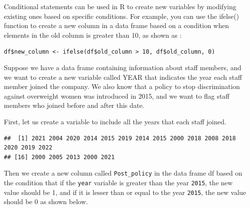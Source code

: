 \documentclass[
]{article}
\newenvironment{Shaded}{\begin{snugshade}}{\end{snugshade}}
\newcommand{\CommentTok}[1]{\textcolor[rgb]{0.56,0.35,0.01}{\textit{#1}}}
\newcommand{\DecValTok}[1]{\textcolor[rgb]{0.00,0.00,0.81}{#1}}
\newcommand{\FunctionTok}[1]{\textcolor[rgb]{0.13,0.29,0.53}{\textbf{#1}}}
\newcommand{\NormalTok}[1]{#1}
\newcommand{\OtherTok}[1]{\textcolor[rgb]{0.56,0.35,0.01}{#1}}
\newcommand{\SpecialCharTok}[1]{\textcolor[rgb]{0.81,0.36,0.00}{\textbf{#1}}}
\begin{document}
Conditional statements can be used in R to create new variables by
modifying existing ones based on specific conditions. For example, you
can use the ifelse() function to create a new column in a data frame
based on a condition when elements in the old column is greater than 10,
as shown as :

\texttt{df\$new\_column\ \textless{}-\ ifelse(df\$old\_column\ \textgreater{}\ 10,\ df\$old\_column,\ 0)}

Suppose we have a data frame containing information about staff members,
and we want to create a new variable called YEAR that indicates the year
each staff member joined the company. We also know that a policy to stop
discrimination against overweight women was introduced in 2015, and we
want to flag staff members who joined before and after this date.

First, let us create a variable to include all the years that each staff
joined.

\begin{Shaded}
\end{Shaded}

\begin{verbatim}
##  [1] 2021 2004 2020 2014 2015 2019 2014 2015 2000 2018 2008 2018 2020 2019 2022
## [16] 2000 2005 2013 2000 2021
\end{verbatim}

Then we create a new column called \texttt{Post\_policy} in the data
frame df based on the condition that if the \texttt{year} variable is
greater than the year \texttt{2015}, the new value should be 1, and if
it is lesser than or equal to the year \texttt{2015}, the new value
should be 0 as shown below.
\end{document}
